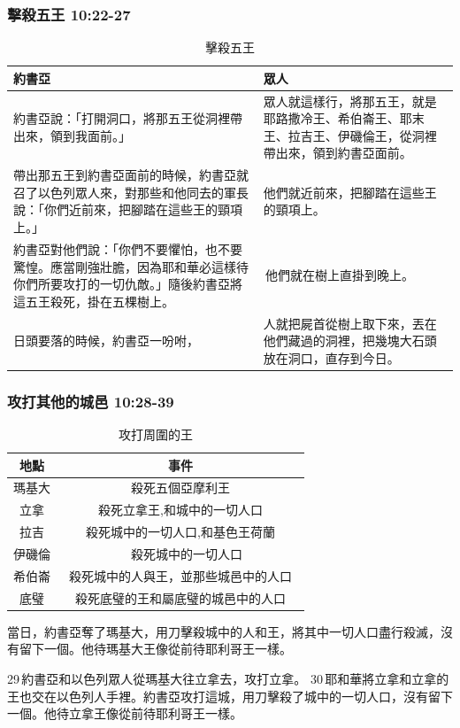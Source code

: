 \subsubsection{擊殺五王 10:22-27}
\begin{table}[H]
\begin{tabular}{ p{}|p{}} \toprule
\toprule
約書亞 &眾人 \\\hline
約書亞說：「打開洞口，將那五王從洞裡帶出來，領到我面前。」 &眾人就這樣行，將那五王，就是耶路撒冷王、希伯崙王、耶末王、拉吉王、伊磯倫王，從洞裡帶出來，領到約書亞面前。\tabularnewline\hline
帶出那五王到約書亞面前的時候，約書亞就召了以色列眾人來，對那些和他同去的軍長說：「你們近前來，把腳踏在這些王的頸項上。」&他們就近前來，把腳踏在這些王的頸項上。\tabularnewline\hline
約書亞對他們說：「你們不要懼怕，也不要驚惶。應當剛強壯膽，因為耶和華必這樣待你們所要攻打的一切仇敵。」隨後約書亞將這五王殺死，掛在五棵樹上。 & 他們就在樹上直掛到晚上。\tabularnewline\hline
日頭要落的時候，約書亞一吩咐，&人就把屍首從樹上取下來，丟在他們藏過的洞裡，把幾塊大石頭放在洞口，直存到今日。 \tabularnewline
\hline\bottomrule
\end{tabular}
\caption{擊殺五王}
\end{table} 


   
\subsubsection{攻打其他的城邑 10:28-39}
\begin{table}
\vspace*{-10mm}
\centering
\begin{tabular}{|c|c|}
\hline
\hline
地點 & 事件  \\\hline
瑪基大 & 殺死五個亞摩利王   \\\hline
立拿&殺死立拿王,和城中的一切人口  \\\hline
拉吉&殺死城中的一切人口,和基色王荷蘭  \\\hline
伊磯倫&　殺死城中的一切人口　\\\hline
希伯崙&殺死城中的人與王，並那些城邑中的人口　\\\hline
底璧&殺死底璧的王和屬底璧的城邑中的人口　\\\hline
\end{tabular}
\caption{攻打周圍的王}
\end{table}
當日，約書亞奪了瑪基大，用刀擊殺城中的人和王，將其中一切人口盡行殺滅，沒有留下一個。他待瑪基大王像從前待耶利哥王一樣。

29 約書亞和以色列眾人從瑪基大往立拿去，攻打立拿。 30 耶和華將立拿和立拿的王也交在以色列人手裡。約書亞攻打這城，用刀擊殺了城中的一切人口，沒有留下一個。他待立拿王像從前待耶利哥王一樣。

